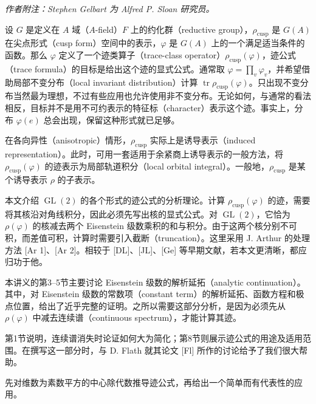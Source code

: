\noindent\textit{作者附注：Stephen Gelbart 为 Alfred P. Sloan 研究员。}

设 $G$ 是定义在 $A$ 域（$A$-field）$F$ 上的约化群（reductive group），$\rho_{\mathrm{cusp}}$ 是 $G(A)$ 在尖点形式（cusp form）空间中的表示，$\varphi$ 是 $G(A)$ 上的一个满足适当条件的函数。那么 $\varphi$ 定义了一个迹类算子（trace-class operator）$\rho_{\mathrm{cusp}}(\varphi)$，迹公式（trace formula）的目标是给出这个迹的显式公式。通常取 $\varphi=\prod_v\varphi_v$，并希望借助局部不变分布（local invariant distribution）计算 $\operatorname{tr}\rho_{\mathrm{cusp}}(\varphi)$。只出现不变分布当然最为理想，不过有些应用也允许使用非不变分布。无论如何，与通常的看法相反，目标并不是用不可约表示的特征标（character）表示这个迹。事实上，分布 $\varphi(e)$ 总会出现，保留这种形式就已足够。

在各向异性（anisotropic）情形，$\rho_{\mathrm{cusp}}$ 实际上是诱导表示（induced representation）。此时，可用一套适用于余紧商上诱导表示的一般方法，将 $\rho_{\mathrm{cusp}}(\varphi)$ 的迹表示为局部轨道积分（local orbital integral）。一般地，$\rho_{\mathrm{cusp}}$ 是某个诱导表示 $\rho$ 的子表示。

本文介绍 $\operatorname{GL}(2)$ 的各个形式的迹公式的分析理论。计算 $\rho_{\mathrm{cusp}}(\varphi)$ 的迹，需要将其核沿对角线积分，因此必须先写出核的显式公式。对 $\operatorname{GL}(2)$，它恰为 $\rho(\varphi)$ 的核减去两个 Eisenstein 级数乘积的和与积分。由于这两个核分别不可积，而差值可积，计算时需要引入截断（truncation）。这里采用 J. Arthur 的处理方法 [Ar 1]、[Ar 2]。相较于 [DL]、[JL]、[Ge] 等早期文献，若本文更清晰，都应归功于他。

本讲义的第3--5节主要讨论 Eisenstein 级数的解析延拓（analytic continuation）。其中，对 Eisenstein 级数的常数项（constant term）的解析延拓、函数方程和极点位置，给出了近乎完整的证明。之所以需要这部分分析，是因为必须先从 $\rho(\varphi)$ 中减去连续谱（continuous spectrum），才能计算其迹。

第1节说明，连续谱消失时论证如何大为简化；第8节则展示迹公式的用途及适用范围。在撰写这一部分时，与 D. Flath 就其论文 [Fl] 所作的讨论给予了我们很大帮助。

先对维数为素数平方的中心除代数推导迹公式，再给出一个简单而有代表性的应用。

